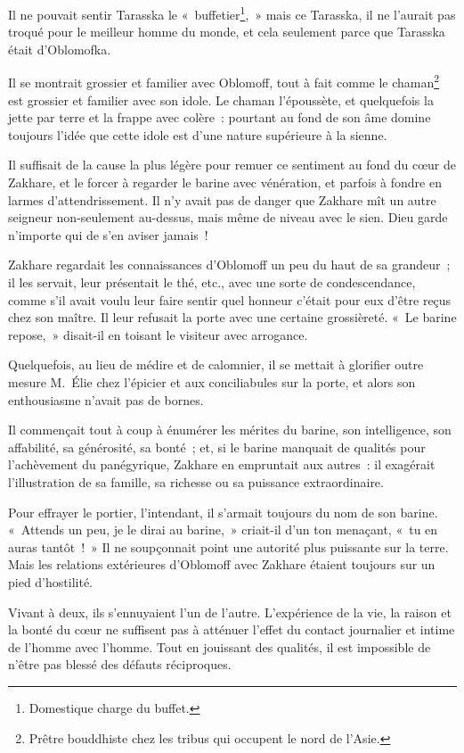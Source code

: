 \documentclass[french,twoside]{book} %
\begin{document}
Il ne pouvait sentir Tarasska le « buffetier\footnote{Domestique charge du buffet.}, » mais ce Tarasska, il ne l’aurait pas troqué pour le meilleur homme du monde, et cela seulement parce que Tarasska était d’Oblomofka.\par
Il se montrait grossier et familier avec Oblomoff, tout à fait comme le chaman\footnote{Prêtre bouddhiste chez les tribus qui occupent le nord de l’Asie.} est grossier et familier avec son idole. Le chaman l’époussète, et quelquefois la jette par terre et la frappe avec colère : pourtant au fond de son âme domine toujours l’idée que cette idole est d’une nature supérieure à la sienne.\par
Il suffisait de la cause la plus légère pour remuer ce sentiment au fond du cœur de Zakhare, et le forcer à regarder le barine avec vénération, et parfois à fondre en larmes d’attendrissement. Il n’y avait pas de danger que Zakhare mît un autre seigneur non-seulement au-dessus, mais même de niveau avec le sien. Dieu garde n’importe qui de s’en aviser jamais !\par
Zakhare regardait les connaissances d’Oblomoff un peu du haut de sa grandeur ; il les servait, leur présentait le thé, etc., avec une sorte de condescendance, comme s’il avait voulu leur faire sentir quel honneur c’était pour eux d’être reçus chez son maître. Il leur refusait la porte avec une certaine grossièreté. « Le barine repose, » disait-il en toisant le visiteur avec arrogance.\par
Quelquefois, au lieu de médire et de calomnier, il se mettait à glorifier outre mesure M. Élie chez l’épicier et aux conciliabules sur la porte, et alors son enthousiasme n’avait pas de bornes.\par
Il commençait tout à coup à énumérer les mérites du barine, son intelligence, son affabilité, sa générosité, sa bonté ; et, si le barine manquait de qualités pour l’achèvement du panégyrique, Zakhare en empruntait aux autres : il exagérait l’illustration de sa famille, sa richesse ou sa puissance extraordinaire.\par
Pour effrayer le portier, l’intendant, il s’armait toujours du nom de son barine. « Attends un peu, je le dirai au barine, » criait-il d’un ton menaçant, « tu en auras tantôt ! » Il ne soupçonnait point une autorité plus puissante sur la terre. Mais les relations extérieures d’Oblomoff avec Zakhare étaient toujours sur un pied d’hostilité.\par
Vivant à deux, ils s’ennuyaient l’un de l’autre. L’expérience de la vie, la raison et la bonté du cœur ne suffisent pas à atténuer l’effet du contact journalier et intime de l’homme avec l’homme. Tout en jouissant des qualités, il est impossible de n’être pas blessé des défauts réciproques.\par
\end{document}
